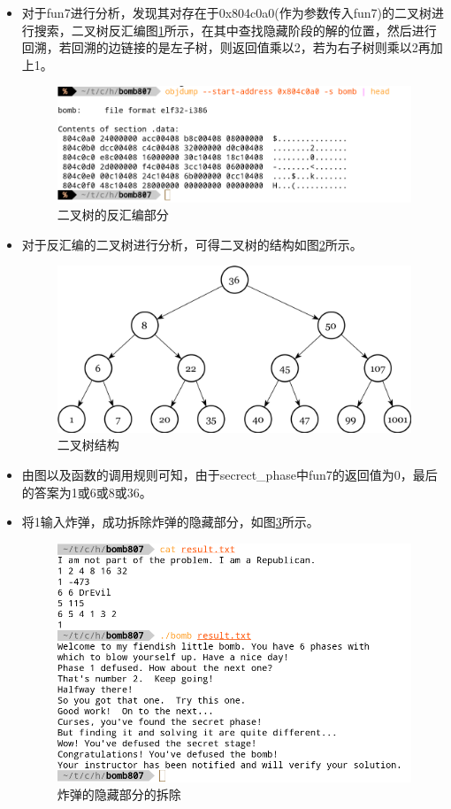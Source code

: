 \begin{itemize}
\begin{codeFont}
		\end{codeFont}
	\item 对于fun7进行分析，发现其对存在于0x804c0a0(作为参数传入fun7)的二叉树进行搜索，二叉树反汇编图\ref{fig:fig15}所示，在其中查找隐藏阶段的解的位置，然后进行回溯，若回溯的边链接的是左子树，则返回值乘以2，若为右子树则乘以2再加上1。
		\begin{figure}[H]
			\centering
			\includegraphics[width=0.95\linewidth]{resources/fig15.png}
			\caption{二叉树的反汇编部分}
			\label{fig:fig15}
		\end{figure}
	\item 对于反汇编的二叉树进行分析，可得二叉树的结构如图\ref{fig:fig16}所示。
		\begin{figure}[H]
			\centering
			\includegraphics[width=0.95\linewidth]{resources/fig16.png}
			\caption{二叉树结构}
			\label{fig:fig16}
		\end{figure}
	\item 由图以及函数的调用规则可知，由于secrect\_phase中fun7的返回值为0，最后的答案为1或6或8或36。
	\item 将1输入炸弹，成功拆除炸弹的隐藏部分，如图\ref{fig:fig17}所示。
		\begin{figure}[H]
			\centering
			\includegraphics[width=0.95\linewidth]{resources/fig17.png}
			\caption{炸弹的隐藏部分的拆除}
			\label{fig:fig17}
		\end{figure}
\end{itemize}


